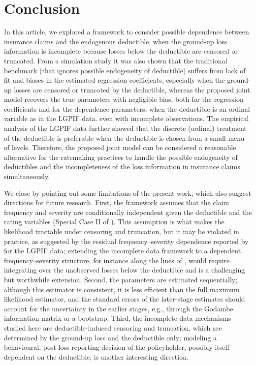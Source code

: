 \documentclass[11pt]{article}
\newcommand{\rev}[1]{{\color{blue}#1}}
\begin{document}
\section{Conclusion}

In this article, we explored a framework to consider possible dependence between insurance claims and the endogenous deductible, \rev{when the ground-up loss information is incomplete because losses below the deductible are censored or truncated}. From a simulation study it was also shown that the traditional benchmark (that ignores possible endogeneity of deductible) suffers from lack of fit and biases in the estimated regression coefficients, especially when the \rev{ground-up losses are censored or truncated by the deductible,} whereas the proposed joint model \rev{recovers the true parameters with negligible bias}\rev{, both for the regression coefficients and for the dependence parameters, when the deductible is an ordinal variable as in the LGPIF data}. even with incomplete observations. \rev{The empirical analysis of the LGPIF data further showed that the discrete (ordinal) treatment of the deductible is preferable when the deductible is chosen from a small menu of levels.} Therefore, the proposed joint model can be considered a reasonable alternative for the ratemaking practices to handle the possible endogeneity of deductibles and \rev{the incompleteness of the loss information} in insurance claims simultaneously.

\rev{We close by pointing out some limitations of the present work, which also suggest directions for future research. First, the framework assumes that the claim frequency and severity are conditionally independent given the deductible and the rating variables (Special Case II of \citet{shi2022copula}). This assumption is what makes the likelihood tractable under censoring and truncation, but it may be violated in practice, as suggested by the residual frequency--severity dependence reported by \citet{shi2022copula} for the LGPIF data; extending the incomplete data framework to a dependent frequency--severity structure, for instance along the lines of \citet{garrido2016glm}, would require integrating over the unobserved losses below the deductible and is a challenging but worthwhile extension. Second, the parameters are estimated sequentially; although this estimator is consistent, it is less efficient than the full maximum likelihood estimator, and the standard errors of the later-stage estimates should account for the uncertainty in the earlier stages, e.g., through the Godambe information matrix or a bootstrap. Third, the incomplete data mechanisms studied here are deductible-induced censoring and truncation, which are determined by the ground-up loss and the deductible only; modeling a behavioural, post-loss reporting decision of the policyholder, possibly itself dependent on the deductible, is another interesting direction.}
\end{document}
